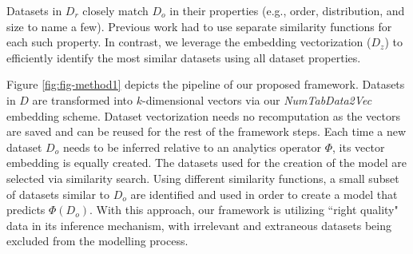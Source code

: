 
Datasets in $D_r$ closely match $D_o$ in their properties (e.g., order, distribution, and size to name a few). Previous work \cite{b7Apollo1, b7Apollo2} had to use separate similarity functions for each such property. In contrast, we leverage the embedding vectorization ($D_z$) to efficiently identify the most similar datasets using all dataset properties.


Figure \ref{fig:fig-method1} depicts the pipeline of our proposed framework. Datasets in $D$ are transformed into $k$-dimensional vectors via our \textit{NumTabData2Vec} embedding scheme. Dataset vectorization needs no recomputation as the vectors are saved and can be reused for the rest of the framework steps. Each time a new dataset $D_o$ needs to be inferred relative to an analytics operator $\Phi$, its vector embedding is equally created. The datasets used for the creation of the model are selected via similarity search. Using different similarity functions, a small subset of datasets similar to $D_o$ are identified and used in order to create a model that predicts $\Phi(D_o)$. With this approach, our framework is utilizing ``right quality" data in its inference mechanism, with irrelevant and extraneous datasets being excluded from the modelling process.

